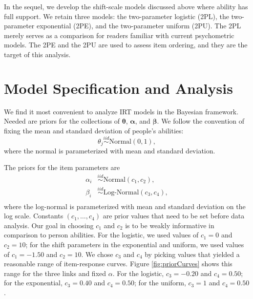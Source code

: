\documentclass[english,,man]{apa6}
\begin{document}
In the sequel, we develop the shift-scale models discussed above where ability has full support. We retain three models: the two-parameter logistic (2PL), the two-parameter exponential (2PE), and the two-parameter uniform (2PU). The 2PL merely serves as a comparison for readers familiar with current psychometric models. The 2PE and the 2PU are used to assess item ordering, and they are the target of this analysis.

\hypertarget{model-specification-and-analysis}{%
\section{Model Specification and Analysis}\label{model-specification-and-analysis}}

We find it most convenient to analyze IRT models in the Bayesian framework. Needed are priors for the collections of \(\bm \theta\), \(\bm \alpha\), and \(\bm \beta\). We follow the convention of fixing the mean and standard deviation of people's abilities:
\[
\theta_j \stackrel{iid}{\sim} \mbox{Normal}(0,1),
\]
where the normal is parameterized with mean and standard deviation.

The priors for the item parameters are
\[
\begin{aligned}
\alpha_i &\stackrel{iid}{\sim} \mbox{Normal}(c_1,c_2),\\
\beta_i &\stackrel{iid}{\sim} \mbox{Log-Normal}(c_3, c_4),\\
\end{aligned}
\]
where the log-normal is parameterized with mean and standard deviation on the log scale. Constants \((c_1,\ldots,c_4)\) are prior values that need to be set before data analysis. Our goal in choosing \(c_1\) and \(c_2\) is to be weakly informative in comparison to person abilities. For the logistic, we used values of \(c_1=0\) and \(c_2=10\); for the shift parameters in the exponential and uniform, we used values of \(c_1=-1.50\) and \(c_2=10\). We chose \(c_3\) and \(c_4\) by picking values that yielded a reasonable range of item-response curves. Figure \ref{fig:priorCurves} shows this range for the three links and fixed \(\alpha\). For the logistic, \(c_3=-0.20\) and \(c_4=0.50\); for the exponential, \(c_3=0.40\) and \(c_4=0.50\); for the uniform, \(c_3=1\) and \(c_4=0.50\).
\end{document}
